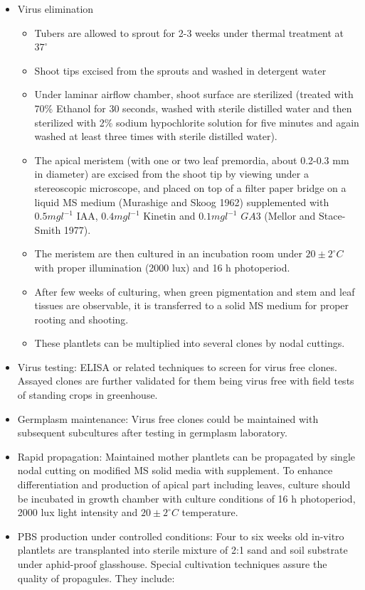 \documentclass[
]{book}
\providecommand{\tightlist}{%
  \setlength{\itemsep}{0pt}\setlength{\parskip}{0pt}}
\begin{document}
\begin{itemize}
\tightlist
\item
  Virus elimination

  \begin{itemize}
  \tightlist
  \item
    Tubers are allowed to sprout for 2-3 weeks under thermal treatment at \(37^\circ\)
  \item
    Shoot tips excised from the sprouts and washed in detergent water
  \item
    Under laminar airflow chamber, shoot surface are sterilized (treated with 70\% Ethanol for 30 seconds, washed with sterile distilled water and then sterilized with 2\% sodium hypochlorite solution for five minutes and again washed at least three times with sterile distilled water).
  \item
    The apical meristem (with one or two leaf premordia, about 0.2-0.3 mm in diameter) are excised from the shoot tip by viewing under a stereoscopic microscope, and placed on top of a filter paper bridge on a liquid MS medium (Murashige and Skoog 1962) supplemented with \(0.5 mg l^{-1}\) IAA, \(0.4 mg l^{-1}\) Kinetin and \(0.1 mg l^{-1}\) \(GA 3\) (Mellor and Stace-Smith 1977).
  \item
    The meristem are then cultured in an incubation room under \(20\pm 2^\circ C\) with proper illumination (2000 lux) and 16 h photoperiod.
  \item
    After few weeks of culturing, when green pigmentation and stem and leaf tissues are observable, it is transferred to a solid MS medium for proper rooting and shooting.
  \item
    These plantlets can be multiplied into several clones by nodal cuttings.
  \end{itemize}
\item
  Virus testing: ELISA or related techniques to screen for virus free clones. Assayed clones are further validated for them being virus free with field tests of standing crops in greenhouse.
\item
  Germplasm maintenance: Virus free clones could be maintained with subsequent subcultures after testing in germplasm laboratory.
\item
  Rapid propagation: Maintained mother plantlets can be propagated by single nodal cutting on modified MS solid media with supplement. To enhance differentiation and production of apical part including leaves, culture should be incubated in growth chamber with culture conditions of 16 h photoperiod, 2000 lux light intensity and \(20 \pm 2^\circ C\) temperature.
\item
  PBS production under controlled conditions: Four to six weeks old in-vitro plantlets are transplanted into sterile mixture of 2:1 sand and soil substrate under aphid-proof glasshouse. Special cultivation techniques assure the quality of propagules. They include:


\end{itemize}
\end{document}

